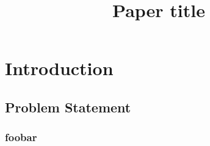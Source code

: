 \documentclass[conference]{IEEEtran}
\begin{document}
\title{Paper title}

\author{
}

\maketitle

\begin{abstract}


\end{abstract}

\section{Introduction}


\subsection{Problem Statement}

\subsubsection{foobar}


%
%
\end{document}
